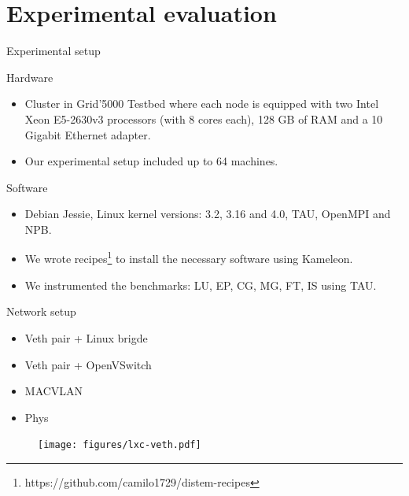 \documentclass[presentation]{beamer}
\begin{document}
\section{Experimental evaluation}
\label{sec-3}

\begin{frame}[label=sec-3-1]{Experimental setup}
\begin{block}{Hardware}
\begin{itemize}
\item Cluster in Grid'5000 Testbed\cite{grid5000} where each node is equipped with two Intel Xeon E5-2630v3 processors (with 8 cores each), 128 GB of RAM and
a 10 Gigabit Ethernet adapter.
\item Our experimental setup included up to 64 machines.
\end{itemize}
\end{block}

\begin{block}{Software}
\begin{itemize}
\item Debian Jessie, Linux kernel versions: 3.2, 3.16 and 4.0, TAU, OpenMPI and NPB.
\item We wrote recipes\footnote{https://github.com/camilo1729/distem-recipes} to install the necessary software using
Kameleon\cite{Ruiz:2015:RSA:2723872.2723883}.
\item We instrumented the benchmarks: LU, EP, CG, MG, FT, IS using TAU\cite{Shende06thetau}.
\end{itemize}
\end{block}
\end{frame}

\begin{frame}[label=sec-3-2]{Network setup}
\begin{itemize}
\item \alert{Veth pair + Linux brigde}
\item Veth pair + OpenVSwitch
\item MACVLAN
\item Phys
\end{itemize}

\begin{figure}[!h]
  \center
  \texttt{[image: figures/lxc-veth.pdf]}
  \label{fig:hpc}
\end{figure}
\end{frame}
\end{document}
